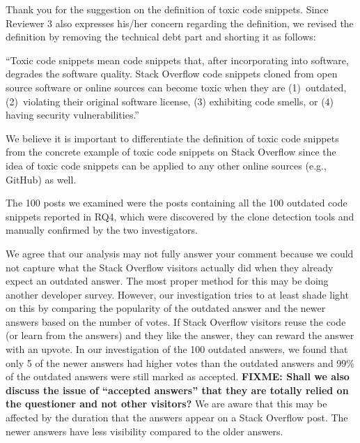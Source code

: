 \documentclass[a4paper,twoside,10pt]{reviewresponse}
\newcommand\FIXME[1]{{\color{red}\textbf{FIXME: #1}}}
\begin{document}
Thank you for the suggestion on the definition of toxic code snippets. Since Reviewer 3 also expresses his/her concern regarding the definition, we revised the definition by removing the technical debt part and shorting it as follows:

``Toxic code snippets mean code snippets that, after incorporating into software, degrades the software quality.
Stack Overflow code snippets
cloned from open source software or online sources can become toxic when they
are (1)~outdated, (2)~violating their original software
license, (3) exhibiting code smells, or (4) having security vulnerabilities.''

We believe it is important to differentiate the definition of toxic code snippets from the concrete example of toxic code snippets on Stack Overflow since the idea of toxic code snippets can be applied to any other online sources (e.g., GitHub) as well.


The 100 posts we examined were the posts containing all the 100 outdated code snippets reported in RQ4, which were discovered by the clone detection tools and manually confirmed by the two investigators.


We agree that our analysis may not fully answer your comment because we could not capture what the Stack Overflow visitors actually did when they already expect an outdated answer. The most proper method for this may be doing another developer survey. However, our investigation tries to at least shade light on this by comparing the popularity of the outdated answer and the newer answers based on the number of votes. If Stack Overflow visitors reuse the code (or learn from the answers) and they like the answer, they can reward the answer with an upvote. In our investigation of the 100 outdated answers, we found that only 5 of the newer answers had higher votes than the outdated answers and 99\% of the outdated answers were still marked as accepted. \FIXME{Shall we also discuss the issue of ``accepted answers'' that they are totally relied on the questioner and not other visitors?} We are aware that this may be affected by the duration that the answers appear on a Stack Overflow post. The newer answers have less visibility compared to the older answers. 
\end{document}
